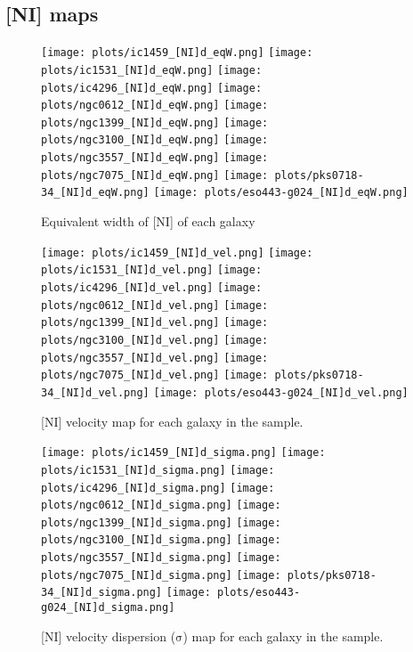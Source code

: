 \documentclass[fleqn,usenatbib,useAMS]{mnras}
\begin{document}
	\subsection{[NI] maps}
		\label{subsec:NImaps}

		\begin{figure*}
			\centering
			\texttt{[image: plots/ic1459\_[NI]d\_eqW.png]}
			\texttt{[image: plots/ic1531\_[NI]d\_eqW.png]}
			\texttt{[image: plots/ic4296\_[NI]d\_eqW.png]}
			\texttt{[image: plots/ngc0612\_[NI]d\_eqW.png]}
			\texttt{[image: plots/ngc1399\_[NI]d\_eqW.png]}
			\texttt{[image: plots/ngc3100\_[NI]d\_eqW.png]}
			\texttt{[image: plots/ngc3557\_[NI]d\_eqW.png]}
			\texttt{[image: plots/ngc7075\_[NI]d\_eqW.png]}
			\texttt{[image: plots/pks0718-34\_[NI]d\_eqW.png]}
			\texttt{[image: plots/eso443-g024\_[NI]d\_eqW.png]}
			\caption{Equivalent width of [NI] of each galaxy}
			\label{fig:NI_eqw}
		\end{figure*}

		\begin{figure*}
			\centering
			\texttt{[image: plots/ic1459\_[NI]d\_vel.png]}
			\texttt{[image: plots/ic1531\_[NI]d\_vel.png]}
			\texttt{[image: plots/ic4296\_[NI]d\_vel.png]}
			\texttt{[image: plots/ngc0612\_[NI]d\_vel.png]}
			\texttt{[image: plots/ngc1399\_[NI]d\_vel.png]}
			\texttt{[image: plots/ngc3100\_[NI]d\_vel.png]}
			\texttt{[image: plots/ngc3557\_[NI]d\_vel.png]}
			\texttt{[image: plots/ngc7075\_[NI]d\_vel.png]}
			\texttt{[image: plots/pks0718-34\_[NI]d\_vel.png]}
			\texttt{[image: plots/eso443-g024\_[NI]d\_vel.png]}
			\caption{[NI] velocity map for each galaxy in the sample.}
			\label{fig:NI_vel}
		\end{figure*}

		\begin{figure*}
			\centering
			\texttt{[image: plots/ic1459\_[NI]d\_sigma.png]}
			\texttt{[image: plots/ic1531\_[NI]d\_sigma.png]}
			\texttt{[image: plots/ic4296\_[NI]d\_sigma.png]}
			\texttt{[image: plots/ngc0612\_[NI]d\_sigma.png]}
			\texttt{[image: plots/ngc1399\_[NI]d\_sigma.png]}
			\texttt{[image: plots/ngc3100\_[NI]d\_sigma.png]}
			\texttt{[image: plots/ngc3557\_[NI]d\_sigma.png]}
			\texttt{[image: plots/ngc7075\_[NI]d\_sigma.png]}
			\texttt{[image: plots/pks0718-34\_[NI]d\_sigma.png]}
			\texttt{[image: plots/eso443-g024\_[NI]d\_sigma.png]}
			\caption{[NI] velocity dispersion ($\mathrm{\sigma}$) map for each galaxy in the sample.}
			\label{fig:NI_sigma}
		\end{figure*}
\end{document}
